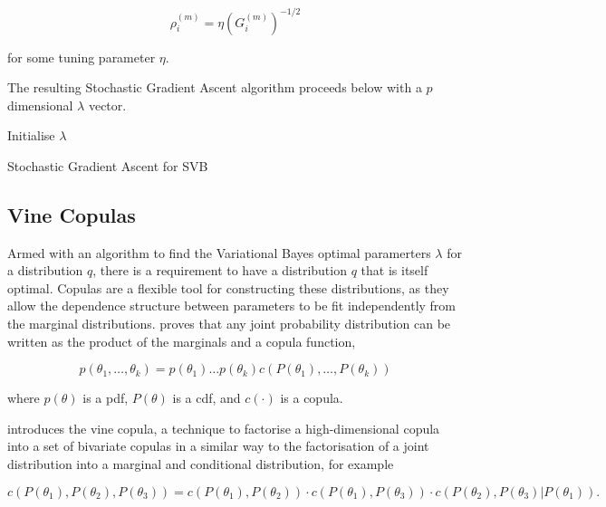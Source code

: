 \documentclass[12pt,a4paper]{article}%
\numberwithin{equation}{section}
\begin{document}
\begin{equation}
\label{SGA4}
\rho^{(m)}_i = \eta \left(G_i^{(m)}\right)^{-1/2}
\end{equation}

for some tuning parameter $\eta$.

The resulting Stochastic Gradient Ascent algorithm proceeds below with a $p$ dimensional $\lambda$ vector.

\begin{algorithm}[H]
 Initialise $\lambda$\;
 \caption{Stochastic Gradient Ascent for SVB}
  \label{alg:algorithm2}
\end{algorithm}


\subsection{Vine Copulas}

Armed with an algorithm to find the Variational Bayes optimal paramerters $\lambda$ for a distribution $q$, there is a requirement to have a distribution $q$ that is itself optimal. Copulas are a flexible tool for constructing these distributions, as they allow the dependence structure between parameters to be fit independently from the marginal distributions. \citet{Sklar1959} proves that any joint probability distribution can be written as the product of the marginals and a copula function,

\begin{equation}
\label{vc1}
p(\theta_1, \dots, \theta_k) = p(\theta_1) \dots p(\theta_k) c(P(\theta_1), \dots, P(\theta_k))
\end{equation}

where $p(\theta)$ is a pdf, $P(\theta)$ is a cdf, and $c(\cdot)$ is a copula. 

\citet{Joe1994} introduces the vine copula, a technique to factorise a high-dimensional copula into a set of bivariate copulas in a similar way to the factorisation of a joint distribution into a marginal and conditional distribution, for example

\begin{equation}
\label{vc2}
c(P(\theta_1), P(\theta_2), P(\theta_3)) = c(P(\theta_1), P(\theta_2)) \cdot c(P(\theta_1), P(\theta_3)) \cdot c(P(\theta_2), P(\theta_3) | P(\theta_1)).
\end{equation}
\end{document}
